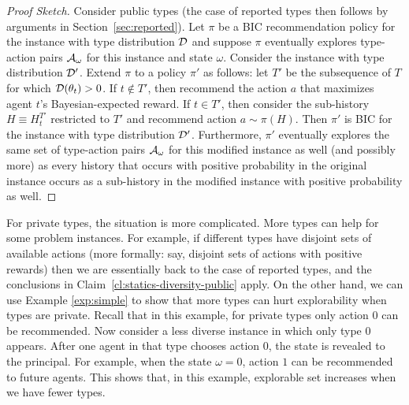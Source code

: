 \begin{proof}[Proof Sketch]
Consider public types (the case of reported types then follows by arguments in Section~\ref{sec:reported}).  Let $\pi$ be a BIC recommendation policy for the instance with type distribution $\mathcal{D}$ and suppose $\pi$ eventually explores type-action pairs $\mathcal{A}_{\omega}$ for this instance and state $\omega$.  Consider the instance with type distribution $\mathcal{D}'$.  Extend $\pi$ to a policy $\pi'$ as follows: let $T'$ be the subsequence of $T$ for which $\mathcal{D}(\theta_t)>0$. If $t\not\in T'$, then recommend the action $a$ that maximizes agent $t$'s Bayesian-expected reward.  If $t\in T'$, then consider the sub-history $H\equiv H^{T'}_t$ restricted to $T'$ and recommend action $a\sim\pi(H)$.  Then $\pi'$ is BIC for the instance with type distribution $\mathcal{D}'$. Furthermore, $\pi'$ eventually explores the same set of type-action pairs $\mathcal{A}_{\omega}$ for this modified instance as well (and possibly more) as every history that occurs with positive probability in the original instance occurs as a sub-history in the modified instance with positive probability as well.
\end{proof}

For private types, the situation is more complicated. More types can help for some problem instances. For example, if different types have disjoint sets of available actions (more formally: say, disjoint sets of actions with positive rewards) then we are essentially back to the case of reported types, and the conclusions in Claim~\ref{cl:statics-diversity-public} apply. On the other hand, we can use Example \ref{exp:simple} to show that more types can hurt explorability when types are private. Recall that in this example, for private types only action 0 can be recommended. Now consider a less diverse instance in which only type 0 appears. After one agent in that type chooses action 0, the state is revealed to the principal. For example, when the state $\omega = 0$, action $1$ can be recommended to future agents. This shows that,  in this example, explorable set increases when we have fewer types.

